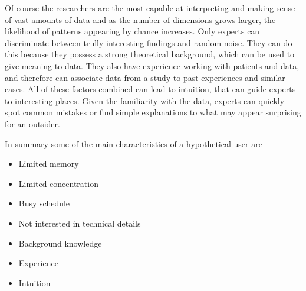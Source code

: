 Of course the researchers are the most capable at interpreting and making sense of  vast amounts of data and as the number of dimensions grows larger, the likelihood of patterns appearing by chance increases. Only experts can discriminate between trully interesting findings and random noise. They can do this because they possess a strong theoretical background, which can be used to give meaning to data. They also have experience working with patients and data, and therefore can associate data from a study to past experiences and similar cases. All of these factors combined can lead to  intuition, that can guide experts to interesting places. Given the familiarity with the data, experts can quickly spot common mistakes or find simple explanations to what may appear surprising for an outsider. 

In summary some of the main characteristics of a hypothetical user are

\begin{itemize}
\item Limited memory
\item Limited concentration
\item Busy schedule
\item Not interested in technical details
\item Background knowledge
\item Experience
\item Intuition
\end{itemize}




